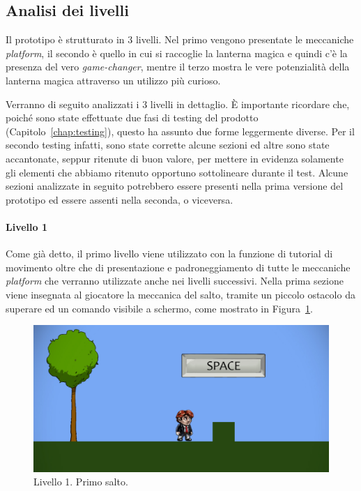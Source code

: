 \subsection{Analisi dei livelli}
\label{sec:analisi_livelli}

Il prototipo è strutturato in 3 livelli. Nel primo vengono presentate le meccaniche \textit{platform}, il secondo è quello in cui si raccoglie la lanterna magica e quindi c’è la presenza del vero \textit{game-changer}, mentre il terzo mostra le vere potenzialità della lanterna magica attraverso un utilizzo più curioso.

Verranno di seguito analizzati i 3 livelli in dettaglio. È importante ricordare che, poiché sono state effettuate due fasi di testing del prodotto (Capitolo~\ref{chap:testing}), questo ha assunto due forme leggermente diverse. Per il secondo testing infatti, sono state corrette alcune sezioni ed altre sono state accantonate, seppur ritenute di buon valore, per mettere in evidenza solamente gli elementi che abbiamo ritenuto opportuno sottolineare durante il test. Alcune sezioni analizzate in seguito potrebbero essere presenti nella prima versione del prototipo ed essere assenti nella seconda, o viceversa.

\paragraph{Livello 1}
\label{par:livello1}

Come già detto, il primo livello viene utilizzato con la funzione di tutorial di movimento oltre che di presentazione e padroneggiamento di tutte le meccaniche \textit{platform} che verranno utilizzate anche nei livelli successivi.
Nella prima sezione viene insegnata al giocatore la meccanica del salto, tramite un piccolo ostacolo da superare ed un comando visibile a schermo, come mostrato in Figura~\ref{fig:livello1_salto}.

\begin{figure}%
	\centering
	\includegraphics[width= 0.8\columnwidth]{images/gameDesign/41_salto.jpg}
	\caption{Livello 1. Primo salto.}
	\label{fig:livello1_salto}
\end{figure}

